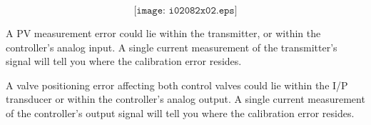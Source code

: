 
$$\texttt{[image: i02082x02.eps]}$$

A PV measurement error could lie within the transmitter, or within the controller's analog input.  A single current measurement of the transmitter's signal will tell you where the calibration error resides.

\vskip 10pt

A valve positioning error affecting both control valves could lie within the I/P transducer or within the controller's analog output.  A single current measurement of the controller's output signal will tell you where the calibration error resides.



























